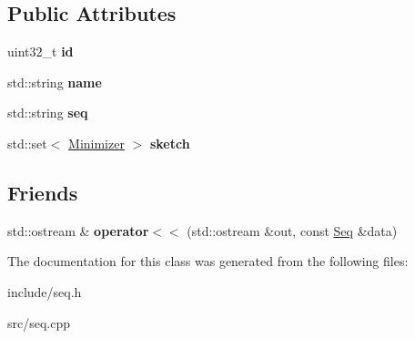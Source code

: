 \subsection*{Public Attributes}
\begin{DoxyCompactItemize}
\item 
\mbox{\label{classSeq_a92ca613f18683745cfdc9c0e41b19c75}} 
uint32\+\_\+t {\bfseries id}
\item 
\mbox{\label{classSeq_ac609fcce0f7b2460dccb093b2c5c11b8}} 
std\+::string {\bfseries name}
\item 
\mbox{\label{classSeq_af6aa27e38a75f7294882d86883246d00}} 
std\+::string {\bfseries seq}
\item 
\mbox{\label{classSeq_a0ec0bde4a1631fd67eeede750f8a8c05}} 
std\+::set$<$ \hyperlink{structMinimizer}{Minimizer} $>$ {\bfseries sketch}
\end{DoxyCompactItemize}
\subsection*{Friends}
\begin{DoxyCompactItemize}
\item 
\mbox{\label{classSeq_a09c523f7cdc8313b2b2ac1dac4cbf1d4}} 
std\+::ostream \& {\bfseries operator$<$$<$} (std\+::ostream \&out, const \hyperlink{classSeq}{Seq} \&data)
\end{DoxyCompactItemize}


The documentation for this class was generated from the following files\+:\begin{DoxyCompactItemize}
\item 
include/seq.\+h\item 
src/seq.\+cpp\end{DoxyCompactItemize}
